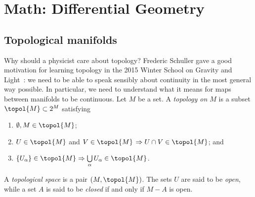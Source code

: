 \chapter{Math: Differential Geometry}
\section{Topological manifolds}
Why should a physicist care about topology? Frederic Schuller gave a good
motivation for learning topology in the 2015 Winter School on Gravity and
Light~\cite{schuller}: we need to be able to speak sensibly about 
continuity in the most general way possible. In particular, we need 
to understand what it means for maps between manifolds to be continuous.  
Let $M$ be a set. A {\it topology on $M$} is a subset
$\topol{M}\subset2^M$ satisfying
\begin{enumerate}
  \item $\emptyset,M\in\topol{M}$;
  \item $U\in\topol{M}$ and $V\in\topol{M}$ $\Rightarrow
         U\cap V\in\topol{M}$; and
  \item $\{U_\alpha\}\in\topol{M}\Rightarrow
           \bigcup\limits_\alpha U_\alpha\in\topol{M}$.
\end{enumerate}
A {\it topological space} is a pair 
$(M,\topol{M})$. The sets $U$ are said to be {\it open}, 
while a set $A$ is said to be {\it closed} if
and only if $M-A$ is open.

